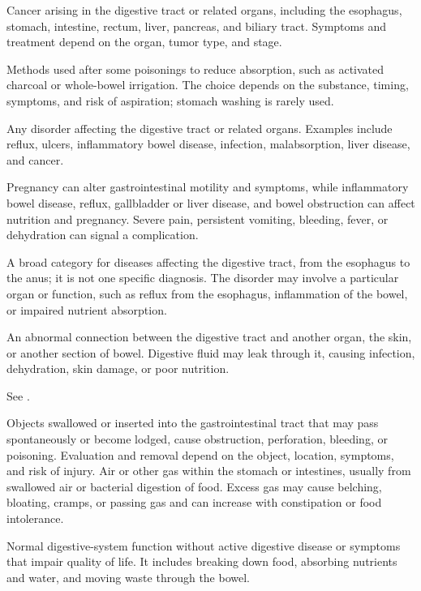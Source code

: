  Cancer arising in the digestive tract or related organs, including the esophagus, stomach, intestine, rectum, liver, pancreas, and biliary tract. Symptoms and treatment depend on the organ, tumor type, and stage.

 Methods used after some poisonings to reduce absorption, such as activated charcoal or whole-bowel irrigation. The choice depends on the substance, timing, symptoms, and risk of aspiration; stomach washing is rarely used.

 Any disorder affecting the digestive tract or related organs. Examples include reflux, ulcers, inflammatory bowel disease, infection, malabsorption, liver disease, and cancer.

 Pregnancy can alter gastrointestinal motility and symptoms, while inflammatory bowel disease, reflux, gallbladder or liver disease, and bowel obstruction can affect nutrition and pregnancy. Severe pain, persistent vomiting, bleeding, fever, or dehydration can signal a complication.

 A broad category for diseases affecting the digestive tract, from the esophagus to the anus; it is not one specific diagnosis. The disorder may involve a particular organ or function, such as reflux from the esophagus, inflammation of the bowel, or impaired nutrient absorption.

 An abnormal connection between the digestive tract and another organ, the skin, or another section of bowel. Digestive fluid may leak through it, causing infection, dehydration, skin damage, or poor nutrition.

 See .

 Objects swallowed or inserted into the gastrointestinal tract that may pass spontaneously or become lodged, cause obstruction, perforation, bleeding, or poisoning. Evaluation and removal depend on the object, location, symptoms, and risk of injury.
 Air or other gas within the stomach or intestines, usually from swallowed air or bacterial digestion of food. Excess gas may cause belching, bloating, cramps, or passing gas and can increase with constipation or food intolerance.

 Normal digestive-system function without active digestive disease or symptoms that impair quality of life. It includes breaking down food, absorbing nutrients and water, and moving waste through the bowel.


